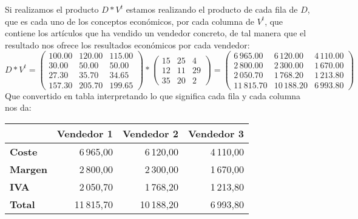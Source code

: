 \documentclass[a4paper,11pt,answers]{exam}
\begin{document}
Si realizamos el producto $D*V^t$ estamos realizando el producto de cada fila de $D$, que es cada uno de los conceptos económicos, por cada columna
de $V^t$, que contiene los artículos que ha vendido un vendedor concreto, de tal manera que el resultado nos ofrece los resultados económicos por cada vendedor:
\[D*V^t = \left(\begin{array}{rrr}
	100.00& 120.00& 115.00\\
	30.00& 50.00& 50.00\\ 
	27.30& 35.70& 34.65\\ 
	157.30& 205.70& 199.65
\end{array}\right) *\left(\begin{array}{rrr}
15& 25& 4\\ 
12& 11& 29\\
35& 20& 2
\end{array}\right) = \left(\begin{array}{rrr}
6\,965.00&6\,120.00&4\,110.00\\
2\,800.00&2\,300.00&1\,670.00\\
2\,050.70&1\,768.20&1\,213.80\\
11\,815.70&10\,188.20&6\,993.80
\end{array}\right)\]
Que convertido en tabla interpretando lo que significa cada fila y cada columna nos da:\\
\begin{center}
	\begin{tabular}{l|r|r|r|}
		\cline{2-4}
		& \multicolumn{1}{l|}{\textbf{Vendedor 1}} & \multicolumn{1}{l|}{\textbf{Vendedor 2}} & \multicolumn{1}{l|}{\textbf{Vendedor 3}} \\ \hline
		\multicolumn{1}{|l|}{\textbf{Coste}}  & 6\,965,00                                & 6\,120,00                                & 4\,110,00                                \\ \hline
		\multicolumn{1}{|l|}{\textbf{Margen}} & 2\,800,00                                & 2\,300,00                                & 1\,670,00                                \\ \hline
		\multicolumn{1}{|l|}{\textbf{IVA}}    & 2\,050,70                                & 1\,768,20                                & 1\,213,80                                \\ \hline
		\multicolumn{1}{|l|}{\textbf{Total}}  & 11\,815,70                               & 10\,188,20                               & 6\,993,80                                \\ \hline
	\end{tabular}
\end{center}
\end{document}
